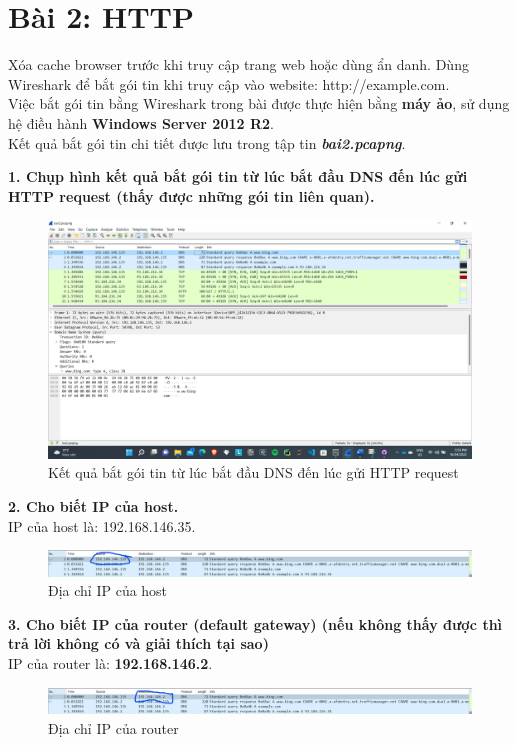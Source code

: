 \section{Bài 2: HTTP}
Xóa cache browser trước khi truy cập trang web hoặc dùng ẩn danh. Dùng Wireshark để bắt gói tin khi truy cập vào website: http://example.com.\\
Việc bắt gói tin bằng Wireshark trong bài được thực hiện bằng \textbf{máy ảo}, sử dụng hệ điều hành \textbf{Windows Server 2012 R2}.\\
Kết quả bắt gói tin chi tiết được lưu trong tập tin \textbf{\textit{bai2.pcapng}}.

\textbf{1. Chụp hình kết quả bắt gói tin từ lúc bắt đầu DNS đến lúc gửi HTTP request (thấy được những gói tin liên quan).}
\begin{figure}[H]
\begin{center}
\includegraphics[scale=.45]{../figures/p2/p2_intro}
\end{center}
\caption{Kết quả bắt gói tin từ lúc bắt đầu DNS đến lúc gửi HTTP request}
\end{figure}

\textbf{2.	Cho biết IP của host.}\\
IP của host là: 192.168.146.35.
\begin{figure}[H]
\begin{center}
\includegraphics[scale=1]{../figures/p2/p2_hostip}
\end{center}
\caption{Địa chỉ IP của host}
\end{figure}

\textbf{3. Cho biết IP của router (default gateway) (nếu không thấy được thì trả lời không có và giải thích tại sao)}\\
IP của router là: \textbf{192.168.146.2}.
\begin{figure}[H]
\begin{center}
\includegraphics[scale=1]{../figures/p2/p2_routerip}
\end{center}
\caption{Địa chỉ IP của router}
\end{figure}


